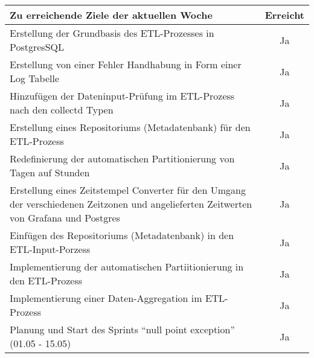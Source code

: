 \begin{tabularx}{\textwidth}{Xc}
    \arrayrulecolor{OliveGreen}
    \toprule
    {\bfseries Zu erreichende Ziele der aktuellen Woche} & {\bfseries Erreicht} \\
    \midrule[2pt]
    Erstellung der Grundbasis des ETL-Prozesses in PostgresSQL &Ja \\
    \rowcolor{OliveGreen!15}
    Erstellung von einer Fehler Handhabung in Form einer Log Tabelle &Ja \\
    \rowcolor{White}
    Hinzufügen der Dateninput-Prüfung im ETL-Prozess nach den collectd
    Typen &Ja \\
    \rowcolor{OliveGreen!15}
    Erstellung eines Repositoriums (Metadatenbank) für den ETL-Prozess &Ja \\
    \rowcolor{White}
    Redefinierung der automatischen Partitionierung von Tagen auf Stunden &Ja \\
    \rowcolor{OliveGreen!15}
    Erstellung eines Zeitstempel Converter für den Umgang der verschiedenen 
    Zeitzonen und angelieferten Zeitwerten von Grafana und Postgres &Ja \\
    \rowcolor{White}
    Einfügen des Repositoriums (Metadatenbank) in den ETL-Input-Porzess &Ja \\
    \rowcolor{OliveGreen!15}
    Implementierung der automatischen Partiitionierung in den ETL-Prozess &Ja \\
    \rowcolor{White}
    Implementierung einer Daten-Aggregation im ETL-Prozess &Ja \\
    \rowcolor{OliveGreen!15}
    Planung und Start des Sprints ``null point exception'' (01.05 \hyp{} 15.05) &Ja \\
    \bottomrule[2pt]
\end{tabularx}
%
\vspace{1cm}
%
